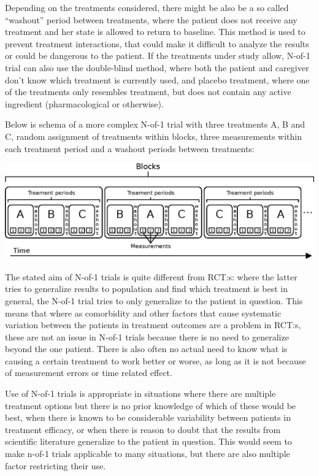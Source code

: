 \documentclass[12pt,a4paper,leqno]{report}
\theoremstyle{plain}
\theoremstyle{definition}
\theoremstyle{remark}
\begin{document}
Depending on the treatments considered, there might be also be a so called ``washout''
period between treatments, where the patient does not receive any treatment and her state
is allowed to return to baseline. This method is used to prevent treatment interactions,
that could make it difficult to analyze the results or could be dangerous to the patient.
If the treatments under study allow, N-of-1 trial can also use the double-blind method,
where both the patient and caregiver don't know which treatment is currently used, and
placebo treatment, where one of the treatments only resembles treatment, but does not
contain any active ingredient (pharmacological or otherwise).

Below is schema of a more complex N-of-1 trial with three treatments A, B and C, random
assignment of treatments within blocks, three measurements within each treatment period
and a washout periods between treatments:

\bigskip
{
    \centering
    \includegraphics{n-of-1_schema.eps}
    \par
}
\bigskip

The stated aim of N-of-1 trials is quite different from RCT:s: where the latter tries to
generalize results to population and find which treatment is best in general, the N-of-1
trial tries to only generalize to the patient in question. This means that where as
comorbidity and other factors that cause systematic variation between the patients in
treatment outcomes are a problem in RCT:s, these are not an issue in N-of-1 trials
because there is no need to generalize beyond the one patient. There is also often no
actual need to know what is causing a certain treatment to work better or worse, as long
as it is not because of measurement errors or time related effect.

Use of N-of-1 trials is appropriate in situations where there are multiple treatment
options but there is no prior knowledge of which of these would be best, when there is
known to be considerable variability between patients in treatment efficacy, or when
there is reason to doubt that the results from scientific literature generalize to the
patient in question\cite{nofone}. This would seem to make n-of-1 trials applicable to
many situations, but there are also multiple factor restricting their use\cite{nofone}.
\end{document}
